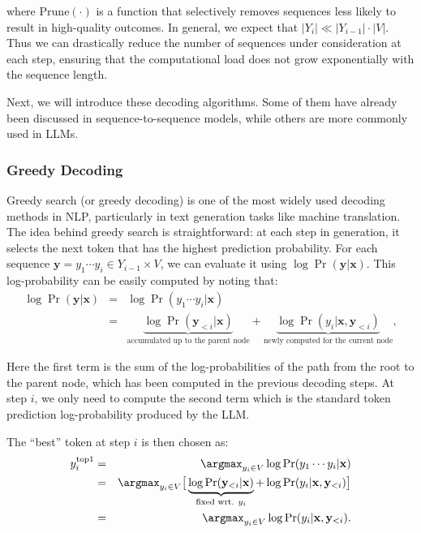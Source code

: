 \noindent where $\mathrm{Prune}(\cdot)$ is a function that selectively removes sequences less likely to result in high-quality outcomes. In general, we expect that $|Y_i| \ll |Y_{i-1}| \cdot |V|$. Thus we can drastically reduce the number of sequences under consideration at each step, ensuring that the computational load does not grow exponentially with the sequence length.

Next, we will introduce these decoding algorithms. Some of them have already been discussed in sequence-to-sequence models, while others are more commonly used in LLMs.

\subsubsection{Greedy Decoding}

Greedy search (or greedy decoding) is one of the most widely used decoding methods in NLP, particularly in text generation tasks like machine translation. The idea behind greedy search is straightforward: at each step in generation, it selects the next token that has the highest prediction probability. For each sequence $\mathbf{y} = y_1\cdots y_i \in Y_{i-1} \times V$, we can evaluate it using
$\log \Pr(\mathbf{y}|\mathbf{x})$. This log-probability can be easily computed by noting that:
\begin{eqnarray}
\log \Pr(\mathbf{y}|\mathbf{x}) & = & \log \Pr(y_1\cdots y_i|\mathbf{x}) \nonumber \\
& = & \underbrace{\log \Pr(\mathbf{y}_{<i}|\mathbf{x})}_{\text{accumulated up to the parent node}} + \underbrace{\log \Pr(y_i|\mathbf{x},\mathbf{y}_{<i})}_{\text{newly computed for the current node}},
\end{eqnarray}

\noindent Here the first term is the sum of the log-probabilities of the path from the root to the parent node, which has been computed in the previous decoding steps. At step $i$, we only need to compute the second term which is the standard token prediction log-probability produced by the LLM.

The ``best'' token at step $i$ is then chosen as:
\begin{eqnarray}
y_i^{\mathrm{top}1} & = & \argmax_{y_i \in V} \log \Pr(y_1\cdots y_i|\mathbf{x}) \nonumber \\
                    & = & \argmax_{y_i \in V} \big[ \underbrace{\log \Pr(\mathbf{y}_{<i}|\mathbf{x})}_{\text{fixed wrt. $y_i$}} + \log \Pr(y_i|\mathbf{x},\mathbf{y}_{<i}) \big] \nonumber \\
                    & = & \argmax_{y_i \in V} \log \Pr(y_i|\mathbf{x},\mathbf{y}_{<i}).
\end{eqnarray}

